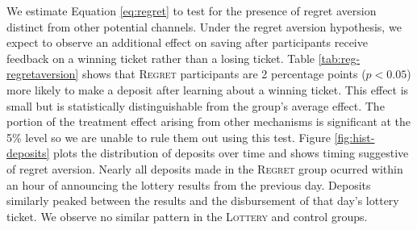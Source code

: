 \documentclass[12pt]{article}
\begin{document}
		We estimate Equation \ref{eq:regret} to test for the presence of regret aversion distinct from other potential channels. Under the regret aversion hypothesis, we expect to observe an additional effect on saving after participants receive feedback on a winning ticket rather than a losing ticket. Table \ref{tab:reg-regretaversion} shows that \textsc{Regret} participants are 2 percentage points ($p<0.05$) more likely to make a deposit after learning about a winning ticket. This effect is small but is statistically distinguishable from the group's average effect. The portion of the treatment effect arising from other mechanisms is significant at the 5\% level so we are unable to rule them out using this test. Figure \ref{fig:hist-deposits} plots the distribution of deposits over time and shows timing suggestive of regret aversion. Nearly all deposits made in the \textsc{Regret} group ocurred within an hour of announcing the lottery results from the previous day. Deposits similarly peaked between the results and the disbursement of that day's lottery ticket. We observe no similar pattern in the \textsc{Lottery} and control groups.

		

		\clearpage




\end{document}
